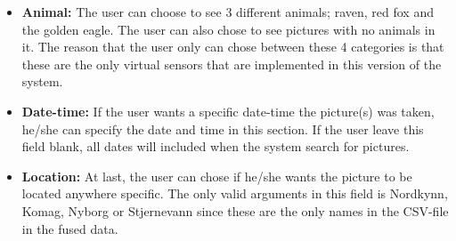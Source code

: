 \documentclass[USenglish]{uit-thesis}
\begin{document}
\begin{itemize}
\item \textbf{Animal:} The user can choose to see 3 different animals; raven, red fox and the golden eagle. The user can also chose to see pictures with no animals in it. The reason that the user only can chose between these 4 categories is that these are the only virtual sensors that are implemented in this version of the system.

\item \textbf{Date-time:} If the user wants a specific date-time the picture(s) was taken, he/she can specify the date and time in this section. If the user leave this field blank, all dates will included when the system search for pictures.

\item \textbf{Location:} At last, the user can chose if he/she wants the picture to be located anywhere specific. The only valid arguments in this field is Nordkynn, Komag, Nyborg or Stjernevann since these are the only names in the CSV-file in the fused data.
\end{itemize}

\end{document}
